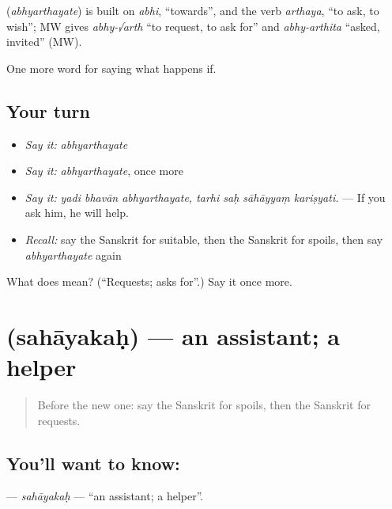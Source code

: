 \begin{cousinweb}
\textbf{} (\emph{abhyarthayate}) is built on \emph{abhi}, \textquotedblleft{}towards\textquotedblright{}, and the verb \emph{arthaya}, \textquotedblleft{}to ask, to wish\textquotedblright{}; MW gives \emph{abhy-√arth} \textquotedblleft{}to request, to ask for\textquotedblright{} and \emph{abhy-arthita} \textquotedblleft{}asked, invited\textquotedblright{} (MW).
\end{cousinweb}

\begin{grammarlens}[title={What you've built}]
One more word for saying what happens if.
\end{grammarlens}

\subsection*{Your turn}
\begin{itemize}
\raggedright
  \item \emph{Say it:} \emph{abhyarthayate}
  \item \emph{Say it:} \emph{abhyarthayate}, once more
  \item \emph{Say it:} \emph{yadi bhavān abhyarthayate, tarhi saḥ sāhāyyaṃ kariṣyati.} — If you ask him, he will help.
  \item \emph{Recall:} say the Sanskrit for suitable, then the Sanskrit for spoils, then say \emph{abhyarthayate} again
\end{itemize}

\begin{tcolorbox}[breakable,colback=teal!4,colframe=teal!35!black,title={Before you move on}]
What does  mean? (\textquotedblleft{}Requests; asks for\textquotedblright{}.) Say it once more.
\end{tcolorbox}
\section[\texorpdfstring{\sk{सहायकः} (sahāyakaḥ)}{सहायकः (sahāyakaḥ)}]{ (sahāyakaḥ) — an assistant; a helper}

\label{lesson:SA-C392-sahayakah}



\begin{quote}
Before the new one: say the Sanskrit for spoils, then the Sanskrit for requests.
\end{quote}

\subsection*{You'll want to know: }
\textbf{} — \emph{sahāyakaḥ} — \textquotedblleft{}an assistant; a helper\textquotedblright{}.


